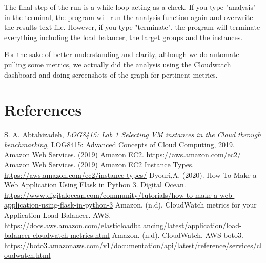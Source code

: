 \documentclass[12pt]{article}
\begin{document}
	\bigskip
	
	The final step of the run is a while-loop acting as a check. If you type "analysis" in the terminal, the program will run the analysis function again and overwrite the results text file. However, if you type "terminate", the program will terminate everything including the load balancer, the target groups and the instances.
	
	\bigskip

    For the sake of better understanding and clarity, although we do automate pulling some metrics, we actually did the analysis using the Cloudwatch dashboard and doing screenshots of the graph for pertinent metrics.

\section{References} \label{sec:references}
	
	\begin{thebibliography} {}
		 S. A. Abtahizadeh, \emph{LOG8415: Lab 1 Selecting VM instances in the Cloud through benchmarking}, LOG8415: Advanced Concepts of Cloud Computing, 2019.
		 Amazon Web Services. (2019) Amazon EC2. \url{https://aws.amazon.com/ec2/}
		 Amazon Web Services. (2019) Amazon EC2 Instance Types. \url{https://aws.amazon.com/ec2/instance-types/}
		 Dyouri,A. (2020). How To Make a Web Application Using Flask in Python 3. Digital Ocean.  \url{https://www.digitalocean.com/community/tutorials/how-to-make-a-web-application-using-flask-in-python-3}
		 Amazon. (n.d). CloudWatch metrics for your Application Load Balancer. AWS. \url{https://docs.aws.amazon.com/elasticloadbalancing/latest/application/load-balancer-cloudwatch-metrics.html}
		 Amazon. (n.d). CloudWatch. AWS boto3. \url{https://boto3.amazonaws.com/v1/documentation/api/latest/reference/services/cloudwatch.html}
	\end{thebibliography}
\end{document}
